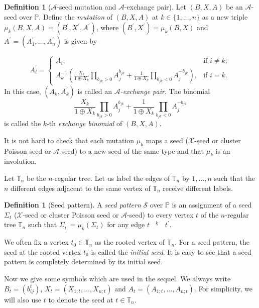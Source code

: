 \documentclass{amsart}
\theoremstyle{definition}
\newtheorem{definition}[theorem]{Definition}
\theoremstyle{remark}
\numberwithin{equation}{section}
\begin{document}
\begin{definition}[$\mathscr A$-seed mutation and $\mathscr A$-exchange pair]
Let  $(B,X, A)$ be an $\mathscr A$-seed over $\mathbb P$. Define the {\em mutation}  of   $(B,X, A)$ at $k\in\{1,\ldots,n\}$ as a new triple $\mu_k(B,X, A)=(B^\prime,X^\prime, A^\prime)$, where $(B^\prime,X^\prime)=\mu_k(B,X)$ and $A^\prime=(A_1^\prime,\ldots,A_n^\prime)$ is given by


$$A_i^{\prime}=\begin{cases}A_i,&\text{if }i\neq k;\\ A_k^{-1}(\frac{X_k}{1\oplus X_k}\prod\limits_{b_{jk}>0}A_j^{b_{jk}}+\frac{1}{1\oplus X_k}\prod\limits_{b_{jk}<0}A_j^{-b_{jk}}),&\text{if }i=k.\end{cases}$$
In this case, $(A_k,A_{k}^\prime)$ is called an {\em $\mathscr A$-exchange pair}. The binomial $$\frac{X_k}{1\oplus X_k}\prod\limits_{b_{jk}>0}A_j^{b_{jk}}+\frac{1}{1\oplus X_k}\prod\limits_{b_{jk}<0}A_j^{-b_{jk}}$$ is called the $k$-th {\em exchange binomial} of  $(B,X, A)$.
\end{definition}
It is not hard to check that each mutation $\mu_k$ maps a seed ($\mathscr X$-seed or cluster Poisson seed or $\mathscr A$-seed) to a new seed of the same type and that $\mu_k$ is an involution.




Let $\mathbb T_n$ be the  $n$-regular tree. Let us label the edges of $\mathbb T_n$ by  $1,\dots,n$ such that the $n$  different edges adjacent to the same vertex of $\mathbb T_n$ receive different labels.
\begin{definition}[Seed pattern]
A {\em seed pattern} $\mathcal S$ over $\mathbb P$ is an assignment of a seed  $\Sigma_t$ ($\mathscr X$-seed or cluster Poisson seed or $\mathscr A$-seed) to every vertex $t$ of the $n$-regular tree $\mathbb T_n$ such that $\Sigma_{t^\prime}=\mu_k(\Sigma_t)$ for any edge $t^{~\underline{\quad k \quad}}~ t^{\prime}$.
\end{definition}
We often fix a vertex $t_0\in\mathbb T_n$ as the rooted vertex of $\mathbb T_n$. For a seed pattern, the seed at the rooted vertex $t_0$ is called the {\em initial seed}.  It is easy to see that a seed pattern is completely determined by its initial seed. 

Now we give some symbols which are used in the sequel.  We always write $B_t=(b_{ij}^t)$, $X_t=(X_{1;t},\ldots,X_{n;t})$ and $A_t=(A_{1;t},\ldots,A_{n;t})$. For simplicity, we will also use $t$ to denote the seed at $t\in\mathbb T_n$.
\end{document}
